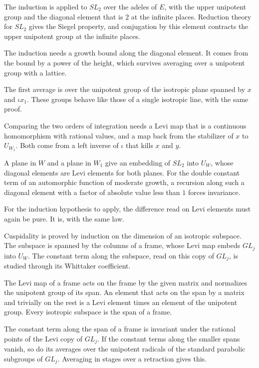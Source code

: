The induction is applied to $SL_2$ over the adeles of $E$, with the upper
unipotent group and the diagonal element that is $2$ at the infinite places.
Reduction theory for $SL_2$ gives the Siegel property, and conjugation by this
element contracts the upper unipotent group at the infinite places.

The induction needs a growth bound along the diagonal element. It comes from
the bound by a power of the height, which survives averaging over a unipotent
group with a lattice.

The first average is over the unipotent group of the isotropic plane spanned by
$x$ and $\iota x_1$. These groups behave like those of a single isotropic line,
with the same proof.

Comparing the two orders of integration needs a Levi map that is a continuous
homomorphism with rational values, and a map back from the stabilizer of $x$
to $U_{W_1}$. Both come from a left inverse of $\iota$ that kills $x$ and $y$.

A plane in $W$ and a plane in $W_1$ give an embedding of $SL_2$ into $U_W$,
whose diagonal elements are Levi elements for both planes. For the double
constant term of an automorphic function of moderate growth, a recursion along
such a diagonal element with a factor of absolute value less than $1$ forces
invariance.

For the induction hypothesis to apply, the difference read on Levi elements
must again be pure. It is, with the same law.

Cuspidality is proved by induction on the dimension of an isotropic subspace.
The subspace is spanned by the columns of a frame, whose Levi map embeds $GL_j$
into $U_W$. The constant term along the subspace, read on this copy of $GL_j$,
is studied through its Whittaker coefficient.

The Levi map of a frame acts on the frame by the given matrix and normalizes
the unipotent group of its span. An element that acts on the span by a matrix
and trivially on the rest is a Levi element times an element of the unipotent
group. Every isotropic subspace is the span of a frame.

The constant term along the span of a frame is invariant under the rational
points of the Levi copy of $GL_j$. If the constant terms along the smaller spans
vanish, so do its averages over the unipotent radicals of the standard
parabolic subgroups of $GL_j$. Averaging in stages over a retraction gives this.

